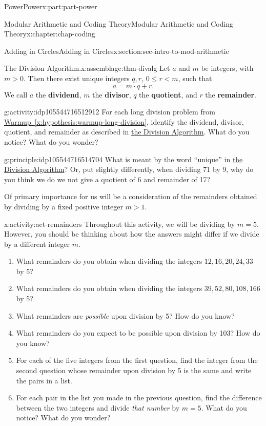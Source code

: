 \documentclass[oneside,10pt,]{book}
\newcommand{\xreffont}{\relax}
\newcommand{\terminology}[1]{\textbf{#1}}
\numberwithin{equation}{section}
\renewcommand{\le}{\leqslant}
\newcommand{\lt}{<}
\newcommand{\gt}{>}
\begin{document}
\begin{partptx}{Power}{}{Power}{}{}{x:part:part-power}
\begin{chapterptx}{Modular Arithmetic and Coding Theory}{}{Modular Arithmetic and Coding Theory}{}{}{x:chapter:chap-coding}
\begin{sectionptx}{Adding in Circles}{}{Adding in Circles}{}{}{x:section:sec-intro-to-mod-arithmetic}
\begin{assemblage}{The Division Algorithm.}{x:assemblage:thm-divalg}
Let \(a\) and \(m\) be integers, with \(m\gt 0\). Then there exist unique integers \(q,r\), \(0\le r \lt m\), such that%
\begin{equation*}
a = m\cdot q + r.
\end{equation*}
We call \(a\) the \terminology{dividend}, \(m\) the \terminology{divisor}, \(q\) the \terminology{quotient}, and \(r\) the \terminology{remainder}.%
\end{assemblage}
\begin{activity}{}{g:activity:idp105544716512912}%
For each long division problem from \hyperref[x:hypothesis:warmup-long-division]{Warmup~{\xreffont\ref{x:hypothesis:warmup-long-division}}}, identify the dividend, divisor, quotient, and remainder as described in \hyperref[x:assemblage:thm-divalg]{the Division Algorithm}. What do you notice? What do you wonder?%
\end{activity}%
\begin{principle}{}{}{g:principle:idp105544716514704}%
What is meant by the word ``unique'' in \hyperref[x:assemblage:thm-divalg]{the Division Algorithm}? Or, put slightly differently, when dividing 71 by 9, why do you think we do we not give a quotient of 6 and remainder of 17?%
\end{principle}
Of primary importance for us will be a consideration of the remainders obtained by dividing by a fixed positive integer \(m\gt 1\).%
\begin{activity}{}{x:activity:act-remainders}%
Throughout this activity, we will be dividing by \(m = 5\). However, you should be thinking about how the answers might differ if we divide by a different integer \(m\).%
%
\begin{enumerate}
\item{}What remainders do you obtain when dividing the integers \(12, 16, 20, 24, 33\) by 5?%
\item{}What remainders do you obtain when dividing the integers \(39, 52, 80, 108, 166\) by 5?%
\item{}What remainders are \emph{possible} upon division by 5? How do you know?%
\item{}What remainders do you expect to be possible upon division by 103? How do you know?%
\item{}For each of the five integers from the first question, find the integer from the second question whose remainder upon division by 5 is the same and write the pairs in a list.%
\item{}For each pair in the list you made in the previous question, find the difference between the two integers and divide \emph{that number} by \(m=5\). What do you notice? What do you wonder?%

\end{enumerate}
\end{activity}
\end{sectionptx}
\end{chapterptx}
\end{partptx}
\end{document}

